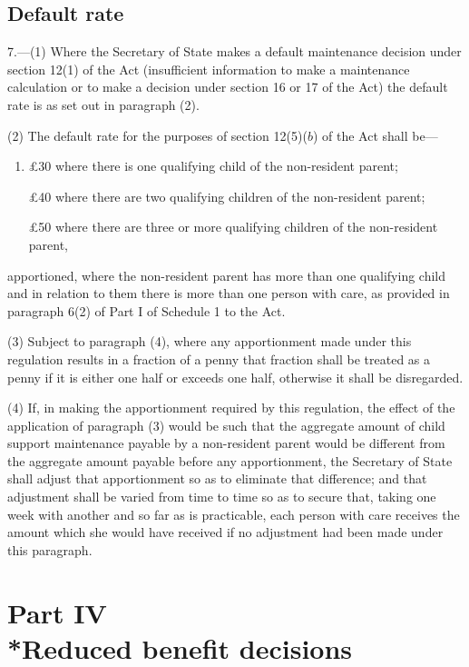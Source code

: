 \documentclass[12pt,a4paper]{article}
\begin{document}
\subsection[7. Default rate]{Default rate}

7.---(1)  Where the Secretary of State makes a default maintenance decision under section 12(1) of the Act (insufficient information to make a maintenance calculation or to make a decision under section 16 or 17 of the Act) the default rate is as set out in paragraph (2).

(2) The default rate for the purposes of section 12(5)($b$)  of the Act shall be—
\begin{enumerate}\item[]
    £30 where there is one qualifying child of the non-resident parent;

    £40 where there are two qualifying children of the non-resident parent;

    £50 where there are three or more qualifying children of the non-resident parent, 
\end{enumerate}
    apportioned, where the non-resident parent has more than one qualifying child and in relation to them there is more than one person with care, as provided in paragraph 6(2) of Part I of Schedule 1 to the Act. 

(3) Subject to paragraph (4), where any apportionment made under this regulation results in a fraction of a penny that fraction shall be treated as a penny if it is either one half or exceeds one half, otherwise it shall be disregarded.

(4) If, in making the apportionment required by this regulation, the effect of the application of paragraph (3) would be such that the aggregate amount of child support maintenance payable by a non-resident parent would be different from the aggregate amount payable before any apportionment, the Secretary of State shall adjust that apportionment so as to eliminate that difference; and that adjustment shall be varied from time to time so as to secure that, taking one week with another and so far as is practicable, each person with care receives the amount which she would have received if no adjustment had been made under this paragraph.

\section[Part IV --- Reduced benefit decisions]{Part IV\\*Reduced benefit decisions}
\end{document}
